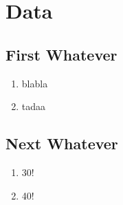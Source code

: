 \section{Data}

\renewcommand{\theenumi}{/D\arabic{enumi}0/}
\renewcommand{\labelenumi}{\theenumi}

\subsection{First Whatever}

\begin{enumerate}
  \item blabla %
  \item tadaa %
\end{enumerate}

\subsection{Next Whatever}

\begin{enumerate}[resume] %
  \item 30!
  \item 40!
\end{enumerate}